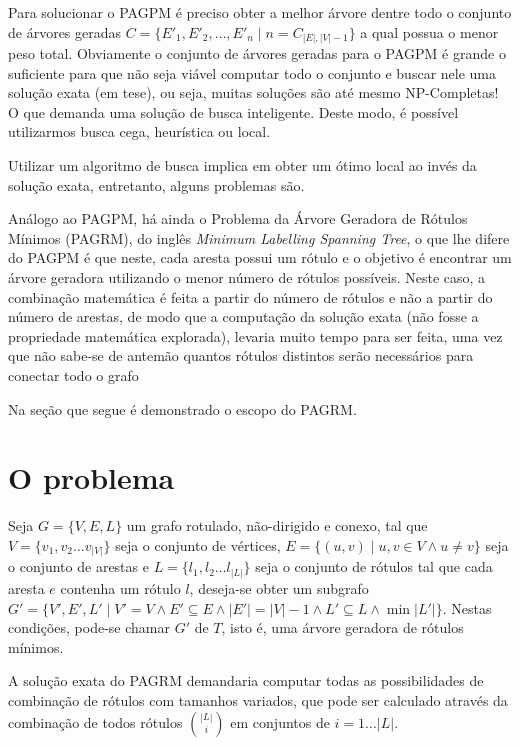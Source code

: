 \documentclass[12pt]{article}
\begin{document}
	Para solucionar o PAGPM é preciso obter a melhor árvore dentre todo o conjunto de árvores geradas $C = \{E'_1, E'_2, \dots, E'_n \mid n = C_{|E|,|V|-1}\}$ a qual possua o menor peso total. Obviamente o conjunto de árvores geradas para o PAGPM é grande o suficiente para que não seja viável computar todo o conjunto e buscar nele uma solução exata (em tese), ou seja, muitas soluções são até mesmo NP-Completas! O que demanda uma solução de busca inteligente. Deste modo, é possível utilizarmos busca cega, heurística ou local.

	Utilizar um algoritmo de busca implica em obter um ótimo local ao invés da solução exata, entretanto, alguns problemas são.
	
	Análogo ao PAGPM, há ainda o Problema da Árvore Geradora de Rótulos Mínimos (PAGRM), do inglês \textit{Minimum Labelling Spanning Tree}, o que lhe difere do PAGPM é que neste, cada aresta possui um rótulo e o objetivo é encontrar um árvore geradora utilizando o menor número de rótulos possíveis. Neste caso, a combinação matemática é feita a partir do número de rótulos e não a partir do número de arestas, de modo que a computação da solução exata (não fosse a propriedade matemática explorada), levaria muito tempo para ser feita, uma vez que não sabe-se de antemão quantos rótulos distintos serão necessários para conectar todo o grafo

	Na seção que segue é demonstrado o escopo do PAGRM.	

\section{O problema}\label{sec:problema}

	Seja $G = \{V, E, L\}$ um grafo rotulado, não-dirigido e conexo, tal que $V = \{v_1, v_2 \dots v_{|V|}\}$ seja o conjunto de vértices, $E = \{(u, v) \mid u, v \in V \wedge u \neq v\}$ seja o conjunto de arestas e $L = \{l_1, l_2 \dots l_{|L|}\}$ seja o conjunto de rótulos tal que cada aresta $e$ contenha um rótulo $l$, deseja-se obter um subgrafo $G' = \{V', E', L' \mid V' = V \wedge E' \subseteq E \wedge |E'| = |V| - 1 \wedge L' \subseteq L \wedge \min|L'|\}$. Nestas condições, pode-se chamar $G'$ de $T$, isto é, uma árvore geradora de rótulos mínimos.

	A solução exata do PAGRM demandaria computar todas as possibilidades de combinação de rótulos com tamanhos variados, que pode ser calculado através da combinação de todos rótulos $\displaystyle{|L| \choose i}$ em conjuntos de $i = 1 \dots |L|$.
\end{document}
